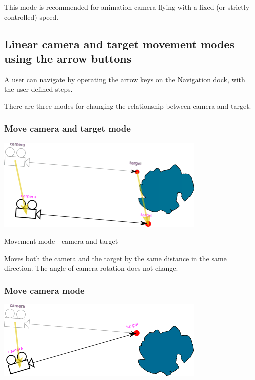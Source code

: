 This mode is recommended for animation camera flying with a fixed (or
strictly controlled) speed.

\subsection{Linear camera and target movement modes using the arrow
buttons}\label{linear-camera-and-target-movement-modes-using-the-arrow-buttons}

A user can navigate by operating the arrow keys on the Navigation dock,
with the user defined steps.

There are three modes for changing the relationship between camera and
target.

\subsubsection{Move camera and target
mode}\label{move-camera-and-target-mode}

\includegraphics[width=3.95347in,height=1.75556in]{img/manual/media/image11.png}

Movement mode - camera and target

Moves both the camera and the target by the same distance in the same
direction. The angle of camera rotation does not change.

\subsubsection{Move camera mode}\label{move-camera-mode}

\includegraphics[width=3.95347in,height=1.48819in]{img/manual/media/image12.png}

